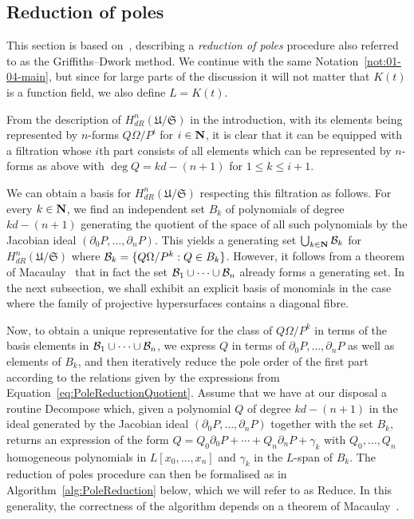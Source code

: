 \subsection{Reduction of poles}
\label{sec:01-04-reduction}

This section is based on~\citep[Remark~3.2.5]{AbbottKedlayaRoe2006}, 
describing a \emph{reduction of poles} procedure also referred to as the 
Griffiths--Dwork method.  We continue with the same 
Notation~\ref{not:01-04-main}, but since for large parts of the discussion 
it will not matter that $K(t)$ is a function field, we also define $L = K(t)$.

From the description of $H_{dR}^n(\mathfrak{U}/\mathfrak{S})$ in the 
introduction, with its elements being represented by $n$-forms 
$Q \Omega / P^i$ for $i \in \mathbf{N}$, it is clear that it can be equipped 
with a filtration whose $i$th part consists of all elements which can 
be represented by $n$-forms as above with $\deg Q = k d - (n+1)$ for 
$1 \leq k \leq i+1$.

We can obtain a basis for $H_{dR}^n(\mathfrak{U}/\mathfrak{S})$ 
respecting this filtration as follows.  For every $k \in \mathbf{N}$, we find 
an independent set $B_k$ of polynomials of degree $kd-(n+1)$ generating 
the quotient of the space of all such polynomials by the Jacobian ideal 
$(\partial_0 P, \dotsc, \partial_n P)$.  This yields a generating set 
$\bigcup_{k \in \mathbf{N}} \mathcal{B}_k$ for $H_{dR}^n(\mathfrak{U}/\mathfrak{S})$ where 
$\mathcal{B}_k = \{Q \Omega / P^k : Q \in B_k\}$.  However, it follows from a 
theorem of Macaulay~\citep[\S 4, (4.11)]{Griffiths1969} that in fact 
the set $\mathcal{B}_1 \cup \dotsb \cup \mathcal{B}_n$ already forms a generating set.  In 
the next subsection, we shall exhibit an explicit basis of monomials in the 
case where the family of projective hypersurfaces contains a diagonal fibre.

Now, to obtain a unique representative for the class of $Q \Omega / P^k$ 
in terms of the basis elements in $\mathcal{B}_1 \cup \dotsb \cup \mathcal{B}_n$, we 
express $Q$ in terms of $\partial_0 P, \dotsc, \partial_n P$ as well as 
elements of $B_k$, and then iteratively reduce the pole order of the first 
part according to the relations given by the expressions from 
Equation~\eqref{eq:PoleReductionQuotient}.  Assume that we have at our 
disposal a routine {\sc Decompose} which, given a polynomial $Q$ of degree 
$kd - (n+1)$ in the ideal generated by the Jacobian ideal 
$(\partial_0 P, \dotsc, \partial_n P)$ together with the set $B_k$, returns an 
expression of the form 
$Q = Q_0 \partial_0 P + \dotsb + Q_n \partial_n P + \gamma_k$ with 
$Q_0, \dotsc, Q_n$ homogeneous polynomials in $L[x_0, \dotsc, x_n]$ and 
$\gamma_k$ in the $L$-span of $B_k$.  The reduction of poles procedure can 
then be formalised as in Algorithm~\ref{alg:PoleReduction} below, which we 
will refer to as {\sc Reduce}.  In this generality, the correctness of the 
algorithm depends on a theorem of Macaulay~\citep[\S 4, (4.11)]{Griffiths1969}.

